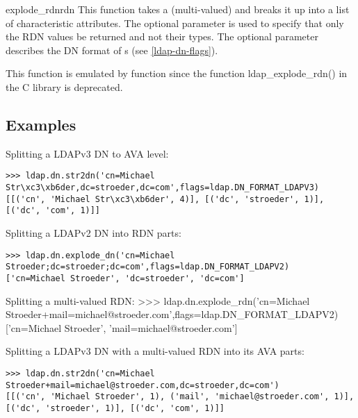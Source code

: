 \begin{funcdesc}{explode_rdn}{rdn } %
  This function takes a (multi-valued)  and breaks it up
  into a list of characteristic attributes. The optional
   parameter is used to specify that only the RDN values be 
  returned and not their types. The optional  parameter
  describes the DN format of s (see \ref{ldap-dn-flags}).

  This function is emulated by function 
  since the function ldap_explode_rdn() in the C library is deprecated.
\end{funcdesc}


\subsection{Examples \label{ldap-dn-example}}

Splitting a LDAPv3 DN to AVA level:
\begin{verbatim}
>>> ldap.dn.str2dn('cn=Michael Str\xc3\xb6der,dc=stroeder,dc=com',flags=ldap.DN_FORMAT_LDAPV3)
[[('cn', 'Michael Str\xc3\xb6der', 4)], [('dc', 'stroeder', 1)], [('dc', 'com', 1)]]
\end{verbatim}

Splitting a LDAPv2 DN into RDN parts:
\begin{verbatim}
>>> ldap.dn.explode_dn('cn=Michael Stroeder;dc=stroeder;dc=com',flags=ldap.DN_FORMAT_LDAPV2)
['cn=Michael Stroeder', 'dc=stroeder', 'dc=com']
\end{verbatim}

Splitting a multi-valued RDN:
>>> ldap.dn.explode_rdn('cn=Michael Stroeder+mail=michael@stroeder.com',flags=ldap.DN_FORMAT_LDAPV2)
['cn=Michael Stroeder', 'mail=michael@stroeder.com']

Splitting a LDAPv3 DN with a multi-valued RDN into its AVA parts:
\begin{verbatim}
>>> ldap.dn.str2dn('cn=Michael Stroeder+mail=michael@stroeder.com,dc=stroeder,dc=com')
[[('cn', 'Michael Stroeder', 1), ('mail', 'michael@stroeder.com', 1)], [('dc', 'stroeder', 1)], [('dc', 'com', 1)]]
\end{verbatim}
